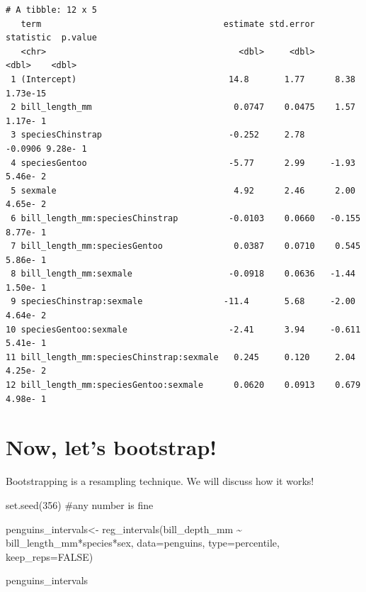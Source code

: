 \documentclass[
  letterpaper,
  DIV=11,
  numbers=noendperiod]{scrartcl}
\newenvironment{Shaded}{\begin{snugshade}}{\end{snugshade}}
\newcommand{\AttributeTok}[1]{\textcolor[rgb]{0.40,0.45,0.13}{#1}}
\newcommand{\CommentTok}[1]{\textcolor[rgb]{0.37,0.37,0.37}{#1}}
\newcommand{\ConstantTok}[1]{\textcolor[rgb]{0.56,0.35,0.01}{#1}}
\newcommand{\DecValTok}[1]{\textcolor[rgb]{0.68,0.00,0.00}{#1}}
\newcommand{\FunctionTok}[1]{\textcolor[rgb]{0.28,0.35,0.67}{#1}}
\newcommand{\NormalTok}[1]{\textcolor[rgb]{0.00,0.23,0.31}{#1}}
\newcommand{\OtherTok}[1]{\textcolor[rgb]{0.00,0.23,0.31}{#1}}
\newcommand{\SpecialCharTok}[1]{\textcolor[rgb]{0.37,0.37,0.37}{#1}}
\newcommand{\StringTok}[1]{\textcolor[rgb]{0.13,0.47,0.30}{#1}}
\begin{document}
\begin{verbatim}
# A tibble: 12 x 5
   term                                    estimate std.error statistic  p.value
   <chr>                                      <dbl>     <dbl>     <dbl>    <dbl>
 1 (Intercept)                              14.8       1.77      8.38   1.73e-15
 2 bill_length_mm                            0.0747    0.0475    1.57   1.17e- 1
 3 speciesChinstrap                         -0.252     2.78     -0.0906 9.28e- 1
 4 speciesGentoo                            -5.77      2.99     -1.93   5.46e- 2
 5 sexmale                                   4.92      2.46      2.00   4.65e- 2
 6 bill_length_mm:speciesChinstrap          -0.0103    0.0660   -0.155  8.77e- 1
 7 bill_length_mm:speciesGentoo              0.0387    0.0710    0.545  5.86e- 1
 8 bill_length_mm:sexmale                   -0.0918    0.0636   -1.44   1.50e- 1
 9 speciesChinstrap:sexmale                -11.4       5.68     -2.00   4.64e- 2
10 speciesGentoo:sexmale                    -2.41      3.94     -0.611  5.41e- 1
11 bill_length_mm:speciesChinstrap:sexmale   0.245     0.120     2.04   4.25e- 2
12 bill_length_mm:speciesGentoo:sexmale      0.0620    0.0913    0.679  4.98e- 1
\end{verbatim}

\hypertarget{now-lets-bootstrap}{%
\section{Now, let's bootstrap!}\label{now-lets-bootstrap}}

Bootstrapping is a resampling technique. We will discuss how it works!

\begin{Shaded}
\begin{Highlighting}[]
\FunctionTok{set.seed}\NormalTok{(}\DecValTok{356}\NormalTok{) }\CommentTok{\#any number is fine}

\NormalTok{penguins\_intervals}\OtherTok{\textless{}{-}} \FunctionTok{reg\_intervals}\NormalTok{(bill\_depth\_mm }\SpecialCharTok{\textasciitilde{}}\NormalTok{ bill\_length\_mm}\SpecialCharTok{*}\NormalTok{species}\SpecialCharTok{*}\NormalTok{sex, }\AttributeTok{data=}\NormalTok{penguins, }
                                   \AttributeTok{type=}\StringTok{\textquotesingle{}percentile\textquotesingle{}}\NormalTok{,}
                                   \AttributeTok{keep\_reps=}\ConstantTok{FALSE}\NormalTok{)}

\NormalTok{penguins\_intervals}
\end{Highlighting}
\end{Shaded}
\end{document}
